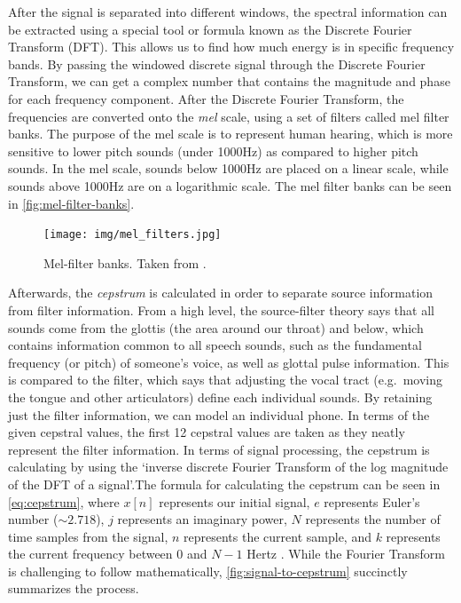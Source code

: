 \documentclass
[
    a4paper,
    twoside,
    12pt,
]
{report}
\begin{document}
After the signal is separated into different windows, the spectral
information can be extracted using a special tool or formula known as
the Discrete Fourier Transform (DFT). This allows us to find how much
energy is in specific frequency bands. By passing the windowed discrete
signal through the Discrete Fourier Transform, we can get a complex
number that contains the magnitude and phase for each frequency
component. After the Discrete Fourier Transform, the frequencies are
converted onto the \emph{mel} scale, using a set of filters called mel
filter banks. The purpose of the mel scale is to represent human
hearing, which is more sensitive to lower pitch sounds (under 1000Hz) as
compared to higher pitch sounds. In the mel scale, sounds below 1000Hz
are placed on a linear scale, while sounds above 1000Hz are on a
logarithmic scale. The mel filter banks can be seen in
\autoref{fig:mel-filter-banks}.

\begin{figure}[]
\centering
\texttt{[image: img/mel\_filters.jpg]}
\caption{Mel-filter banks. Taken from \textcite{fayek2016}.}
\label{fig:mel-filter-banks}
\end{figure}

Afterwards, the \emph{cepstrum} is calculated in order to separate
source information from filter information. From a high level, the
source-filter theory says that all sounds come from the glottis (the
area around our throat) and below, which contains information common to
all speech sounds, such as the fundamental frequency (or pitch) of
someone's voice, as well as glottal pulse information. This is compared
to the filter, which says that adjusting the vocal tract (e.g.~moving
the tongue and other articulators) define each individual sounds. By
retaining just the filter information, we can model an individual phone.
In terms of the given cepstral values, the first 12 cepstral values are
taken as they neatly represent the filter information. In terms of
signal processing, the cepstrum is calculating by using the `inverse
discrete Fourier Transform of the log magnitude of the DFT of a
signal'.The formula for calculating the cepstrum can be seen in
\autoref{eq:cepstrum}, where \(x[n]\) represents our initial signal,
\(e\) represents Euler's number (\(\sim2.718\)), \(j\) represents an
imaginary power, \(N\) represents the number of time samples from the
signal, \(n\) represents the current sample, and \(k\) represents the
current frequency between 0 and \(N-1\) Hertz \parencite{azad2017}.
While the Fourier Transform is challenging to follow mathematically,
\autoref{fig:signal-to-cepstrum} succinctly summarizes the process.
\end{document}
